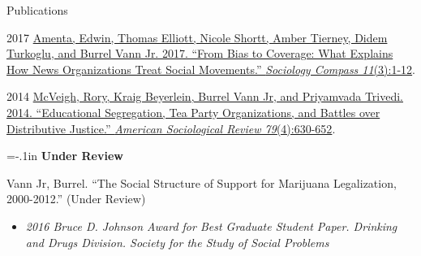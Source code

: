 \begin{rSection}{Publications}




\begin{hangt}{2017 \datefill}
\href{http://onlinelibrary.wiley.com/doi/10.1111/soc4.12460/pdf}{Amenta, Edwin, Thomas Elliott, Nicole Shortt, Amber Tierney, Didem Turkoglu, and Burrel Vann Jr. 2017. ``From Bias to Coverage: What Explains How News Organizations Treat Social Movements.'' {\it{Sociology Compass 11}}(3):1-12}.  %
\end{hangt}
\begin{hangt}{2014 \datefill}
\href{http://asr.sagepub.com/content/79/4/630.full.pdf}{McVeigh, Rory, Kraig Beyerlein, Burrel Vann Jr, and Priyamvada Trivedi. 2014. ``Educational Segregation, Tea Party Organizations, and Battles over Distributive Justice.'' {\it{American Sociological Review 79}}(4):630-652}.\vspace*{8pt}
\end{hangt}

{\parindent=-.1in {\bf Under Review}}

\raggedright

Vann Jr, Burrel. ``The Social Structure of Support for Marijuana Legalization, 2000-2012.'' (Under Review) \vspace*{-.75em} 
\begin{itemize}[leftmargin=.25in]
	\item {\footnotesize \it 2016 Bruce D. Johnson Award for Best Graduate Student Paper. Drinking and Drugs Division. Society for the Study of Social Problems}
\end{itemize}


\end{rSection}
